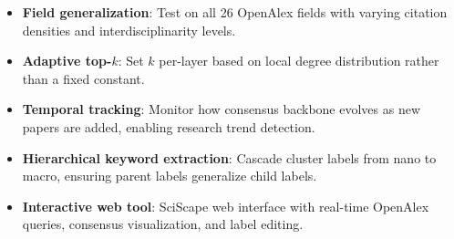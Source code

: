 \documentclass[11pt,a4paper]{article}
\begin{document}
\begin{itemize}[nosep]
    \item \textbf{Field generalization}: Test on all 26 OpenAlex fields with varying citation densities and interdisciplinarity levels.
    \item \textbf{Adaptive top-$k$}: Set $k$ per-layer based on local degree distribution rather than a fixed constant.
    \item \textbf{Temporal tracking}: Monitor how consensus backbone evolves as new papers are added, enabling research trend detection.
    \item \textbf{Hierarchical keyword extraction}: Cascade cluster labels from nano to macro, ensuring parent labels generalize child labels.
    \item \textbf{Interactive web tool}: SciScape web interface with real-time OpenAlex queries, consensus visualization, and label editing.
\end{itemize}
\end{document}
